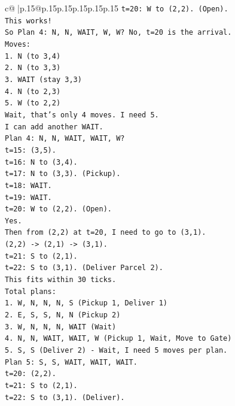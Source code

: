 \documentclass{article}
\begin{document}
{\begin{supertabular}{c@{$\;$}|p{.15\linewidth}@{}p{.15\linewidth}p{.15\linewidth}p{.15\linewidth}p{.15\linewidth}p{.15\linewidth}}
{{{\texttt{t=20: W to (2,2). (Open).} \\
\texttt{This works!} \\
\texttt{So Plan 4: N, N, WAIT, W, W? No, t=20 is the arrival.} \\
\texttt{Moves:} \\
\texttt{1. N (to 3,4)} \\
\texttt{2. N (to 3,3)} \\
\texttt{3. WAIT (stay 3,3)} \\
\texttt{4. N (to 2,3)} \\
\texttt{5. W (to 2,2)} \\
\texttt{Wait, that's only 4 moves. I need 5.} \\
\texttt{I can add another WAIT.} \\
\texttt{Plan 4: N, N, WAIT, WAIT, W?} \\
\texttt{t=15: (3,5).} \\
\texttt{t=16: N to (3,4).} \\
\texttt{t=17: N to (3,3). (Pickup).} \\
\texttt{t=18: WAIT.} \\
\texttt{t=19: WAIT.} \\
\texttt{t=20: W to (2,2). (Open).} \\
\texttt{Yes.} \\
\texttt{Then from (2,2) at t=20, I need to go to (3,1).} \\
\texttt{(2,2) {-}> (2,1) {-}> (3,1).} \\
\texttt{t=21: S to (2,1).} \\
\texttt{t=22: S to (3,1). (Deliver Parcel 2).} \\
\texttt{This fits within 30 ticks.} \\
\texttt{Total plans:} \\
\texttt{1. W, N, N, N, S (Pickup 1, Deliver 1)} \\
\texttt{2. E, S, S, N, N (Pickup 2)} \\
\texttt{3. W, N, N, N, WAIT (Wait)} \\
\texttt{4. N, N, WAIT, WAIT, W (Pickup 1, Wait, Move to Gate)} \\
\texttt{5. S, S (Deliver 2) {-} Wait, I need 5 moves per plan.} \\
\texttt{Plan 5: S, S, WAIT, WAIT, WAIT.} \\
\texttt{t=20: (2,2).} \\
\texttt{t=21: S to (2,1).} \\
\texttt{t=22: S to (3,1). (Deliver).} \\
}}}
\end{supertabular}}
\end{document}
